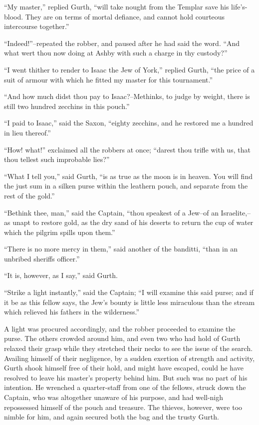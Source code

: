 ``My master,'' replied Gurth, ``will take nought from the Templar save
his life's-blood. They are on terms of mortal defiance, and cannot hold
courteous intercourse together.''

``Indeed!''--repeated the robber, and paused after he had said the word.
``And what wert thou now doing at Ashby with such a charge in thy
custody?''

``I went thither to render to Isaac the Jew of York,'' replied Gurth,
``the price of a suit of armour with which he fitted my master for this
tournament.''

``And how much didst thou pay to Isaac?--Methinks, to judge by weight,
there is still two hundred zecchins in this pouch.''

``I paid to Isaac,'' said the Saxon, ``eighty zecchins, and he restored
me a hundred in lieu thereof.''

``How! what!'' exclaimed all the robbers at once; ``darest thou trifle
with us, that thou tellest such improbable lies?''

``What I tell you,'' said Gurth, ``is as true as the moon is in heaven.
You will find the just sum in a silken purse within the leathern pouch,
and separate from the rest of the gold.''

``Bethink thee, man,'' said the Captain, ``thou speakest of a Jew--of an
Israelite,--as unapt to restore gold, as the dry sand of his deserts to
return the cup of water which the pilgrim spills upon them.''

``There is no more mercy in them,'' said another of the banditti, ``than
in an unbribed sheriffs officer.''

``It is, however, as I say,'' said Gurth.

``Strike a light instantly,'' said the Captain; ``I will examine this
said purse; and if it be as this fellow says, the Jew's bounty is little
less miraculous than the stream which relieved his fathers in the
wilderness.''

A light was procured accordingly, and the robber proceeded to examine
the purse. The others crowded around him, and even two who had hold of
Gurth relaxed their grasp while they stretched their necks to see the
issue of the search. Availing himself of their negligence, by a sudden
exertion of strength and activity, Gurth shook himself free of their
hold, and might have escaped, could he have resolved to leave his
master's property behind him. But such was no part of his intention. He
wrenched a quarter-staff from one of the fellows, struck down the
Captain, who was altogether unaware of his purpose, and had well-nigh
repossessed himself of the pouch and treasure. The thieves, however,
were too nimble for him, and again secured both the bag and the trusty
Gurth.

